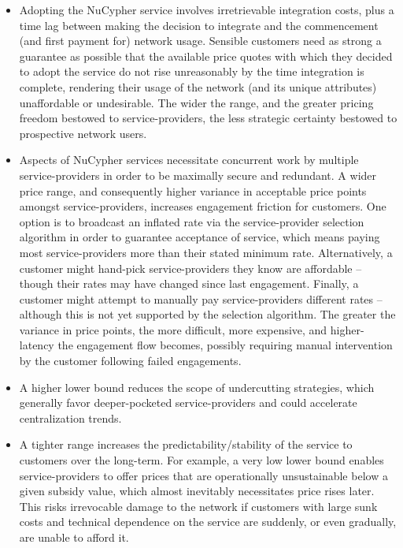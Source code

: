 \documentclass[longbibliography,nofootinbib]{revtex4-1}
\begin{document}
\begin{itemize}
    \item Adopting the NuCypher service involves irretrievable integration costs, plus a time lag between making the decision to integrate and the commencement (and first payment for) network usage. Sensible customers need as strong a guarantee as possible that the available price quotes with which they decided to adopt the service do not rise unreasonably by the time integration is complete, rendering their usage of the network (and its unique attributes) unaffordable or undesirable. The wider the range, and the greater pricing freedom bestowed to service-providers, the less strategic certainty bestowed to prospective network users.
    \item Aspects of NuCypher services necessitate concurrent work by multiple service-providers in order to be maximally secure and redundant. A wider price range, and consequently higher variance in acceptable price points amongst service-providers, increases engagement friction for customers. One option is to broadcast an inflated rate via the service-provider selection algorithm in order to guarantee acceptance of service, which means paying most service-providers more than their stated minimum rate. Alternatively, a customer might hand-pick service-providers they know are affordable – though their rates may have changed since last engagement. Finally, a customer might attempt to manually pay service-providers different rates – although this is not yet supported by the selection algorithm. The greater the variance in price points, the more difficult, more expensive, and higher-latency the engagement flow becomes, possibly requiring manual intervention by the customer following failed engagements.
    \item A higher lower bound reduces the scope of undercutting strategies, which generally favor deeper-pocketed service-providers and could accelerate centralization trends. \item A tighter range increases the predictability/stability of the service to customers over the long-term. For example, a very low lower bound enables service-providers to offer prices that are operationally unsustainable below a given subsidy value, which almost inevitably necessitates price rises later. This risks irrevocable damage to the network if customers with large sunk costs and technical dependence on the service are suddenly, or even gradually, are unable to afford it. 
\end{itemize}
\end{document}
